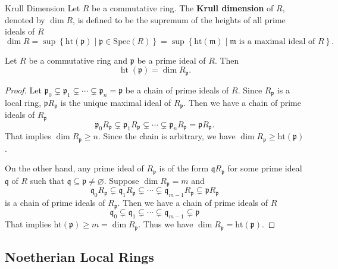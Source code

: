 \begin{definition}{Krull Dimension}{}
    Let $R$ be a commutative ring. The \textbf{Krull dimension} of $R$, denoted by $\dim R$, is defined to be the supremum of the heights of all prime ideals of $R$
    \[
    \dim R=\sup\left\{\mathrm{ht}(\mathfrak{p})\mid\mathfrak{p}\in \mathrm{Spec}(R)\right\}= \sup\left\{\mathrm{ht}(\mathfrak{m})\mid\mathfrak{m}\text{ is a maximal ideal of }R\right\}.
    \]
\end{definition}

\begin{proposition}{}{}
    Let $R$ be a commutative ring and $\mathfrak{p}$ be a prime ideal of $R$. Then 
    \[
    \operatorname{ht}\left(\mathfrak{p}\right) = \dim R_{\mathfrak{p}}.
    \]
\end{proposition}
\begin{proof}
    Let $\mathfrak{p}_0\subsetneq\mathfrak{p}_1\subsetneq\cdots\subsetneq\mathfrak{p}_n=\mathfrak{p}$ be a chain of prime ideals of $R$. Since $R_{\mathfrak{p}}$ is a local ring, $\mathfrak{p}R_{\mathfrak{p}}$ is the unique maximal ideal of $R_{\mathfrak{p}}$. Then we have a chain of prime ideals of $R_{\mathfrak{p}}$
    \[
    \mathfrak{p}_0R_{\mathfrak{p}}\subsetneq\mathfrak{p}_1R_{\mathfrak{p}}\subsetneq\cdots\subsetneq\mathfrak{p}_nR_{\mathfrak{p}}=\mathfrak{p}R_{\mathfrak{p}}.
    \]
     That implies $\dim R_{\mathfrak{p}}\geq n$. Since the chain is arbitrary, we have $\dim R_{\mathfrak{p}}\geq \mathrm{ht}(\mathfrak{p})$. 
    
    On the other hand, any prime ideal of $R_{\mathfrak{p}}$ is of the form $\mathfrak{q}R_{\mathfrak{p}}$ for some prime ideal $\mathfrak{q}$ of $R$ such that $\mathfrak{q}\subseteq\mathfrak{p}\ne \varnothing$. Suppose $\dim R_{\mathfrak{p}}=m$ and 
    \[
    \mathfrak{q}_0R_{\mathfrak{p}}\subsetneq\mathfrak{q}_1R_{\mathfrak{p}}\subsetneq\cdots\subsetneq\mathfrak{q}_{m-1}R_{\mathfrak{p}}\subsetneq\mathfrak{p}R_{\mathfrak{p}}
    \]
    is a chain of prime ideals of $R_{\mathfrak{p}}$. Then we have a chain of prime ideals of $R$
    \[
    \mathfrak{q}_0\subsetneq\mathfrak{q}_1\subsetneq\cdots\subsetneq\mathfrak{q}_{m-1}\subsetneq\mathfrak{p}
    \]
   That implies $\mathrm{ht}(\mathfrak{p})\geq m = \dim R_{\mathfrak{p}}$. Thus we have $\dim R_{\mathfrak{p}}= \mathrm{ht}(\mathfrak{p})$.
\end{proof}

\subsection{Noetherian Local Rings}

